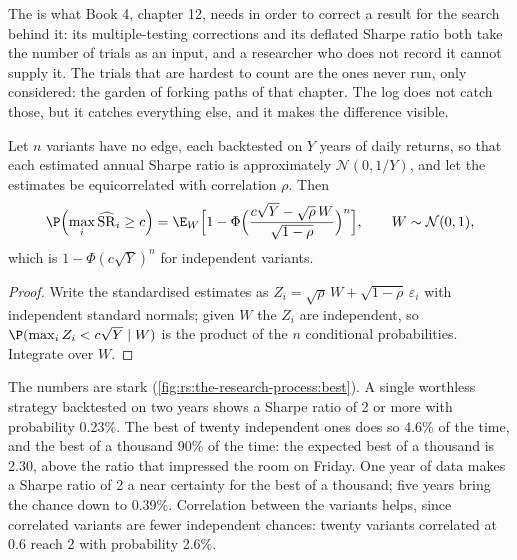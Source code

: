 The  is what Book 4, chapter 12, needs in order to correct a result for the search behind it: its multiple-testing
corrections and its deflated Sharpe ratio both take the number of trials as an input, and a researcher who does not record
it cannot supply it. The trials that are hardest to count are the ones never run, only considered: the garden of forking paths
of that chapter. The log does not catch those, but it catches everything else, and it makes the difference visible.

\begin{proposition}\label{prop:rs:the-research-process:best}
Let $n$ variants have no edge, each backtested on $Y$ years of daily returns, so that each estimated annual Sharpe ratio is
approximately $\mathcal N(0, 1/Y)$, and let the estimates be equicorrelated with correlation $\rho$. Then
\[
\P\Bigl(\max_i \widehat{\mathrm{SR}}_i \ge c\Bigr) = \E_W\Bigl[1 - \Phi\Bigl(\frac{c\sqrt Y - \sqrt\rho\,W}{\sqrt{1 - \rho}}\Bigr)^n\Bigr],
\qquad W \sim \mathcal N(0, 1),
\]
which is $1 - \Phi(c\sqrt Y)^n$ for independent variants.
\end{proposition}

\begin{proof}
Write the standardised estimates as $Z_i = \sqrt\rho\,W + \sqrt{1 - \rho}\,\varepsilon_i$ with independent standard normals; given
$W$ the $Z_i$ are independent, so $\P(\max_i Z_i < c\sqrt Y \mid W)$ is the product of the $n$ conditional probabilities.
Integrate over $W$.
\end{proof}

The numbers are stark (\cref{fig:rs:the-research-process:best}). A single worthless strategy backtested on two years shows a
Sharpe ratio of 2 or more with probability 0.23\%. The best of twenty independent ones does so 4.6\% of the time, and the
best of a thousand 90\% of the time: the expected best of a thousand is 2.30, above the ratio that impressed the room on
Friday. One year of data makes a Sharpe ratio of 2 a near certainty for the best of a thousand; five years bring the chance
down to 0.39\%. Correlation between the variants helps, since correlated variants are fewer independent chances: twenty variants
correlated at 0.6 reach 2 with probability 2.6\%.

